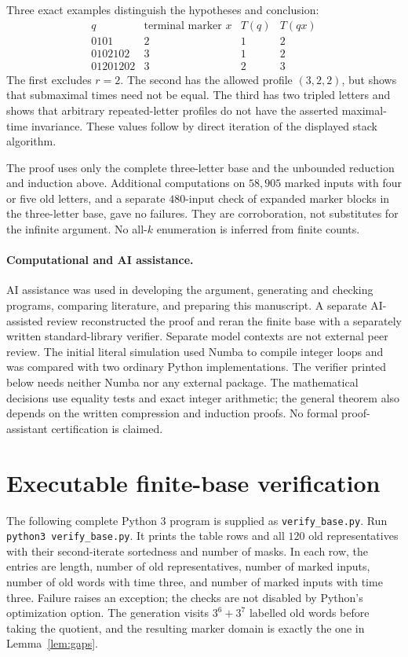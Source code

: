 \documentclass[11pt,a4paper]{article}
\begin{document}
Three exact examples distinguish the hypotheses and conclusion:
\[
\begin{array}{c|c|c|c}
 q & \text{terminal marker }x & T(q) & T(qx)\\ \hline
 0101 & 2 & 1 & 2\\
 0102102 & 3 & 1 & 2\\
 01201202 & 3 & 2 & 3
\end{array}
\]
The first excludes $r=2$. The second has the allowed profile $(3,2,2)$,
but shows that submaximal times need not be equal. The third has two
tripled letters and shows that arbitrary repeated-letter profiles do not
have the asserted maximal-time invariance. These values follow by direct
iteration of the displayed stack algorithm.

The proof uses only the complete three-letter base and the unbounded
reduction and induction above. Additional computations on $58{,}905$ marked
inputs with four or five old letters, and a separate $480$-input check of
expanded marker blocks in the three-letter base, gave no failures. They
are corroboration, not substitutes for the infinite argument. No all-$k$
enumeration is inferred from finite counts.

\paragraph{Computational and AI assistance.}
AI assistance was used in developing the argument, generating and checking
programs, comparing literature, and preparing this manuscript. A separate
AI-assisted review reconstructed the proof and reran the finite base with
a separately written standard-library verifier. Separate model contexts
are not external peer review. The initial literal simulation used Numba
to compile integer loops and was compared with two ordinary Python
implementations. The verifier printed below needs neither Numba nor any
external package. The mathematical decisions use equality tests and exact
integer arithmetic; the general theorem also depends on the written
compression and induction proofs. No formal proof-assistant certification
is claimed.

\appendix
\section{Executable finite-base verification}\label{app:code}

The following complete Python 3 program is supplied as
\texttt{verify\_base.py}. Run \texttt{python3 verify\_base.py}. It prints
the table rows and all $120$ old representatives with their second-iterate
sortedness and number of masks. In each row, the entries are length,
number of old representatives, number of marked inputs, number of old
words with time three, and number of marked inputs with time three.
Failure raises an exception; the checks are not disabled by Python's
optimization option. The generation visits $3^6+3^7$ labelled old words
before taking the quotient, and the resulting marker domain is exactly
the one in Lemma~\ref{lem:gaps}.
\end{document}
